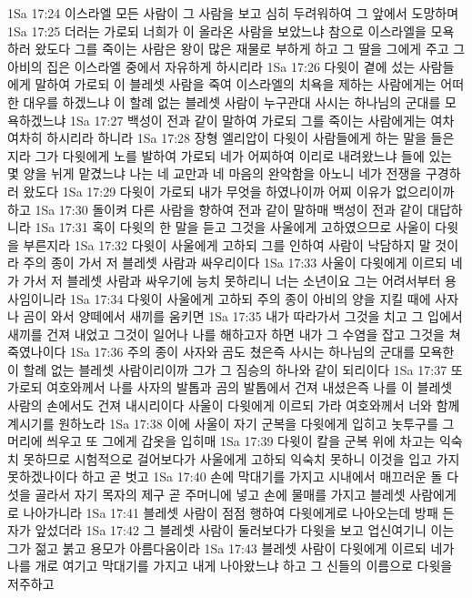 1Sa 17:24  이스라엘 모든 사람이 그 사람을 보고 심히 두려워하여 그 앞에서 도망하며
1Sa 17:25  더러는 가로되 너희가 이 올라온 사람을 보았느냐 참으로 이스라엘을 모욕하러 왔도다 그를 죽이는 사람은 왕이 많은 재물로 부하게 하고 그 딸을 그에게 주고 그 아비의 집은 이스라엘 중에서 자유하게 하시리라
1Sa 17:26  다윗이 곁에 섰는 사람들에게 말하여 가로되 이 블레셋 사람을 죽여 이스라엘의 치욕을 제하는 사람에게는 어떠한 대우를 하겠느냐 이 할례 없는 블레셋 사람이 누구관대 사시는 하나님의 군대를 모욕하겠느냐
1Sa 17:27  백성이 전과 같이 말하여 가로되 그를 죽이는 사람에게는 여차여차히 하시리라 하니라
1Sa 17:28  장형 엘리압이 다윗이 사람들에게 하는 말을 들은지라 그가 다윗에게 노를 발하여 가로되 네가 어찌하여 이리로 내려왔느냐 들에 있는 몇 양을 뉘게 맡겼느냐 나는 네 교만과 네 마음의 완악함을 아노니 네가 전쟁을 구경하러 왔도다
1Sa 17:29  다윗이 가로되 내가 무엇을 하였나이까 어찌 이유가 없으리이까 하고
1Sa 17:30  돌이켜 다른 사람을 향하여 전과 같이 말하매 백성이 전과 같이 대답하니라
1Sa 17:31  혹이 다윗의 한 말을 듣고 그것을 사울에게 고하였으므로 사울이 다윗을 부른지라
1Sa 17:32  다윗이 사울에게 고하되 그를 인하여 사람이 낙담하지 말 것이라 주의 종이 가서 저 블레셋 사람과 싸우리이다
1Sa 17:33  사울이 다윗에게 이르되 네가 가서 저 블레셋 사람과 싸우기에 능치 못하리니 너는 소년이요 그는 어려서부터 용사임이니라
1Sa 17:34  다윗이 사울에게 고하되 주의 종이 아비의 양을 지킬 때에 사자나 곰이 와서 양떼에서 새끼를 움키면
1Sa 17:35  내가 따라가서 그것을 치고 그 입에서 새끼를 건져 내었고 그것이 일어나 나를 해하고자 하면 내가 그 수염을 잡고 그것을 쳐 죽였나이다
1Sa 17:36  주의 종이 사자와 곰도 쳤은즉 사시는 하나님의 군대를 모욕한 이 할례 없는 블레셋 사람이리이까 그가 그 짐승의 하나와 같이 되리이다
1Sa 17:37  또 가로되 여호와께서 나를 사자의 발톱과 곰의 발톱에서 건져 내셨은즉 나를 이 블레셋 사람의 손에서도 건져 내시리이다 사울이 다윗에게 이르되 가라 여호와께서 너와 함께 계시기를 원하노라
1Sa 17:38  이에 사울이 자기 군복을 다윗에게 입히고 놋투구를 그 머리에 씌우고 또 그에게 갑옷을 입히매
1Sa 17:39  다윗이 칼을 군복 위에 차고는 익숙치 못하므로 시험적으로 걸어보다가 사울에게 고하되 익숙치 못하니 이것을 입고 가지 못하겠나이다 하고 곧 벗고
1Sa 17:40  손에 막대기를 가지고 시내에서 매끄러운 돌 다섯을 골라서 자기 목자의 제구 곧 주머니에 넣고 손에 물매를 가지고 블레셋 사람에게로 나아가니라
1Sa 17:41  블레셋 사람이 점점 행하여 다윗에게로 나아오는데 방패 든 자가 앞섰더라
1Sa 17:42  그 블레셋 사람이 둘러보다가 다윗을 보고 업신여기니 이는 그가 젊고 붉고 용모가 아름다움이라
1Sa 17:43  블레셋 사람이 다윗에게 이르되 네가 나를 개로 여기고 막대기를 가지고 내게 나아왔느냐 하고 그 신들의 이름으로 다윗을 저주하고
